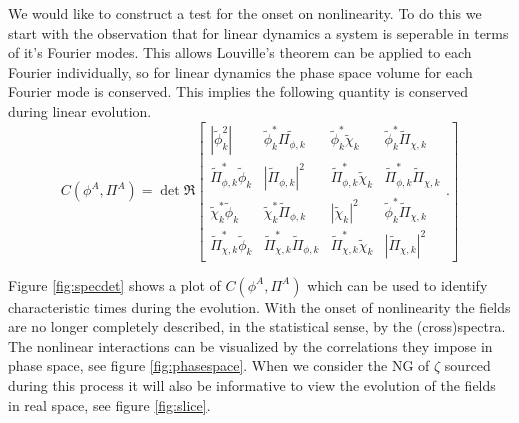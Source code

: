 We would like to construct a test for the onset on nonlinearity.
To do this we start with the observation that for linear dynamics a system is seperable in terms of it's Fourier modes.
This allows Louville's theorem can be applied to each Fourier individually, so for linear dynamics the phase space volume for each Fourier mode is conserved.
This implies the following quantity is conserved during linear evolution.
\begin{equation}
  C(\phi^A,\Pi^A) =
  \det\Re\left[
    \begin{matrix}
      |\tilde{\phi}_k^2| & \tilde{\phi}_k^*\tilde{\Pi_{\phi, k}} & \tilde{\phi}_k^*\tilde{\chi}_k & \tilde{\phi}_k^*\tilde{\Pi}_{\chi, k} \\
      \tilde{\Pi}_{\phi,k}^*\tilde{\phi}_k & |\tilde{\Pi}_{\phi, k}|^2 & \tilde{\Pi}_{\phi,k}^*\tilde{\chi}_k & \tilde{\Pi}_{\phi,k}^*\tilde{\Pi}_{\chi, k} \\
      \tilde{\chi}_k^*\tilde{\phi}_k & \tilde{\chi}_k^*\tilde{\Pi}_{\phi, k} & |\tilde{\chi}_k|^2 & \tilde{\phi}_k^*\tilde{\Pi}_{\chi, k} \\
      \tilde{\Pi}_{\chi,k}^*\tilde{\phi}_k & \tilde{\Pi}_{\chi, k}^*\tilde{\Pi}_{\phi, k} & \tilde{\Pi}_{\chi,k}^*\tilde{\chi}_k & |\tilde{\Pi}_{\chi, k}|^2
    \end{matrix}.
  \right]
\end{equation}


Figure \ref{fig:specdet} shows a plot of $C(\phi^A,\Pi^A)$ which can be used to identify characteristic times during the evolution.
With the onset of nonlinearity the fields are no longer completely described, in the statistical sense, by the (cross)spectra.
The nonlinear interactions can be visualized by the correlations they impose in phase space, see figure \ref{fig:phasespace}.
When we consider the NG of $\zeta$ sourced during this process it will also be informative to view the evolution of the fields in real space, see figure \ref{fig:slice}.

